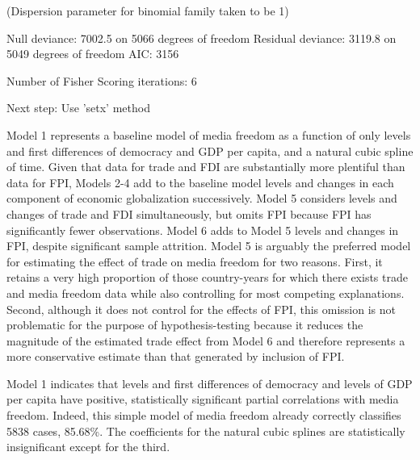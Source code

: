 \documentclass[12pt,a4paper]{article}
\begin{document}
{(Dispersion parameter for binomial family taken to be 1)

    Null deviance: 7002.5  on 5066  degrees of freedom
Residual deviance: 3119.8  on 5049  degrees of freedom
AIC: 3156

Number of Fisher Scoring iterations: 6

Next step: Use 'setx' method
\begin{kframe}

{\ttfamily\noindent\bfseries{}}\end{kframe}
\clearpage
}
Model 1 represents a baseline model of media freedom as a function of only levels and first differences of democracy and GDP per capita, and a natural cubic spline of time. Given that data for trade and FDI are substantially more plentiful than data for FPI, Models 2-4 add to the baseline model levels and changes in each component of economic globalization successively. Model 5 considers levels and changes of trade and FDI simultaneously, but omits FPI because FPI has significantly fewer observations. Model 6 adds to Model 5 levels and changes in FPI, despite significant sample attrition. Model 5 is arguably the preferred model for estimating the effect of trade on media freedom for two reasons. First, it retains a very high proportion of those country-years for which there exists trade and media freedom data while also controlling for most competing explanations. Second, although it does not control for the effects of FPI, this omission is not problematic for the purpose of hypothesis-testing because it reduces the magnitude of the estimated trade effect from Model 6 and therefore represents a more conservative estimate than that generated by inclusion of FPI.

Model 1 indicates that levels and first differences of democracy and levels of GDP per capita have positive, statistically significant partial correlations with media freedom. Indeed, this simple model of media freedom already correctly classifies 5838 cases, 85.68\%. The coefficients for the natural cubic splines are statistically insignificant except for the third.
\end{document}
